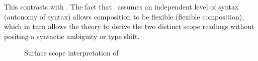 \documentclass[output=paper,hidelinks]{langscibook}
\begin{document}
This contrasts with \glues. 
The fact that \glue\ assumes an independent level of syntax (autonomy
of syntax) allows composition to be flexible (flexible composition),
which in turn allows the theory to derive the two distinct scope
readings without positing a syntactic ambiguity or type shift.

\begin{figure}
  \centering
  \bigskip
  \caption{Surface scope interpretation of
    }
  \label{fig:surf-scope}
\end{figure}

\end{document}
